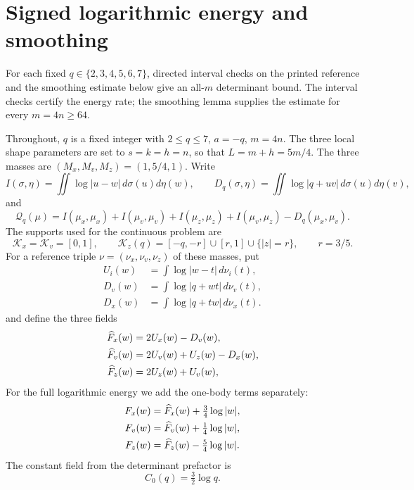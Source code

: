 \section{Signed logarithmic energy and smoothing}
\label{sec:v-analytic}

For each fixed $q\in\{2,3,4,5,6,7\}$, directed interval checks on the printed
reference and the smoothing estimate below give an all-$m$ determinant
bound.  The interval checks certify the energy rate; the smoothing lemma
supplies the estimate for every $m=4n\ge64$.

Throughout, $q$ is a fixed integer with $2\le q\le7$, $a=-q$,
$m=4n$.  The three local shape parameters are set to $s=k=h=n$, so that
$L=m+h=5m/4$.  The three masses are
$(M_x,M_v,M_z)=(1,5/4,1)$.  Write
\[
 I(\sigma,\eta)=\iint\log|u-w|\,d\sigma(u)d\eta(w),\qquad
 D_q(\sigma,\eta)=\iint\log|q+uv|\,d\sigma(u)d\eta(v),
\]
and
\begin{equation}\label{eq:v-energy}
 \mathcal Q_q(\mu)=I(\mu_x,\mu_x)+I(\mu_v,\mu_v)+I(\mu_z,\mu_z)
       +I(\mu_v,\mu_z)-D_q(\mu_x,\mu_v).
\end{equation}
The supports used for the continuous problem are
\[
 \mathcal K_x=\mathcal K_v=[0,1],\qquad
 \mathcal K_z(q)=[-q,-r]\cup[r,1]\cup\{|z|=r\},\qquad r=3/5.
\]
For a reference triple $\nu=(\nu_x,\nu_v,\nu_z)$ of these masses, put
\begin{align*}
 U_i(w)&=\int\log|w-t|\,d\nu_i(t),\\
 D_v(w)&=\int\log|q+wt|\,d\nu_v(t),\\
 D_x(w)&=\int\log|q+tw|\,d\nu_x(t).
\end{align*}
and define the three fields
\begin{align}
 \widehat F_x(w)&=2U_x(w)-D_v(w),\notag\\
 \widehat F_v(w)&=2U_v(w)+U_z(w)-D_x(w),\label{eq:v-q-fields}\\
 \widehat F_z(w)&=2U_z(w)+U_v(w),\notag
\end{align}
For the full logarithmic energy we add the one-body terms separately:
\begin{align}
 F_x(w)&=\widehat F_x(w)+\tfrac34\log|w|,\notag\\
 F_v(w)&=\widehat F_v(w)+\tfrac14\log|w|,\label{eq:v-fields}\\
 F_z(w)&=\widehat F_z(w)-\tfrac54\log|w|.\notag
\end{align}
The constant field from the determinant prefactor is
\begin{equation}\label{eq:v-C0}
 C_0(q)=\tfrac32\log q.
\end{equation}

